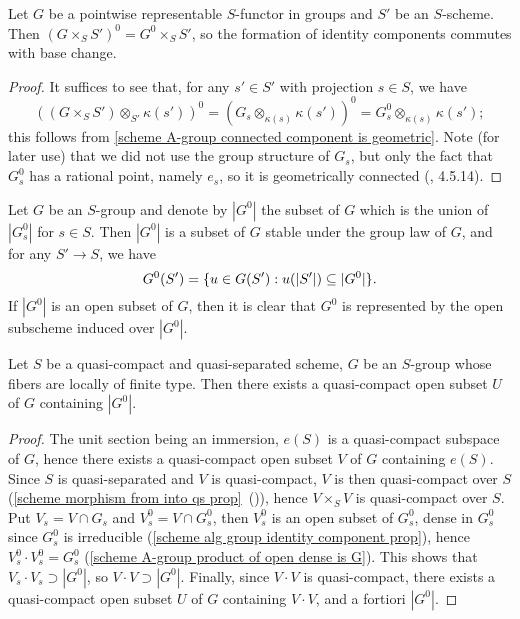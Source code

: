 \begin{proposition}\label{scheme group functor identity component and base change}
Let $G$ be a pointwise representable $S$-functor in groups and $S'$ be an $S$-scheme. Then $(G\times_SS')^0=G^0\times_SS'$, so the formation of identity components commutes with base change.
\end{proposition}
\begin{proof}
It suffices to see that, for any $s'\in S'$ with projection $s\in S$, we have
\[((G\times_SS')\otimes_{S'}\kappa(s'))^0=(G_s\otimes_{\kappa(s)}\kappa(s'))^0=G_s^0\otimes_{\kappa(s)}\kappa(s');\]
this follows from \cref{scheme A-group connected component is geometric}. Note (for later use) that we did not use the group structure of $G_s$, but only the fact that $G_s^0$ has a rational point, namely $e_s$, so it is geometrically connected (\cite{EGA4-2}, 4.5.14).
\end{proof}

\begin{example}\label{scheme group identity component represented by |G^0|}
Let $G$ be an $S$-group and denote by $|G^0|$ the subset of $G$ which is the union of $|G^0_s|$ for $s\in S$. Then $|G^0|$ is a subset of $G$ stable under the group law of $G$, and for any $S'\to S$, we have
\[G^0(S')=\{u\in G(S'):u(|S'|)\subseteq |G^0|\}.\]
If $|G^0|$ is an open subset of $G$, then it is clear that $G^0$ is represented by the open subscheme induced over $|G^0|$.
\end{example}

\begin{proposition}\label{scheme group over qcqs fiber ft identity component qc}
Let $S$ be a quasi-compact and quasi-separated scheme, $G$ be an $S$-group whose fibers are locally of finite type. Then there exists a quasi-compact open subset $U$ of $G$ containing $|G^0|$.
\end{proposition}
\begin{proof}
The unit section being an immersion, $e(S)$ is a quasi-compact subspace of $G$, hence there exists a quasi-compact open subset $V$ of $G$ containing $e(S)$. Since $S$ is quasi-separated and $V$ is quasi-compact, $V$ is then quasi-compact over $S$ (\cref{scheme morphism from into qs prop}~()), hence $V\times_SV$ is quasi-compact over $S$. Put $V_s=V\cap G_s$ and $V^0_s=V\cap G^0_s$, then $V_s^0$ is an open subset of $G^0_s$, dense in $G_s^0$ since $G^0_s$ is irreducible (\cref{scheme alg group identity component prop}), hence $V_s^0\cdot V_s^0=G^0_s$ (\cref{scheme A-group product of open dense is G}). This shows that $V_s\cdot V_s\supset|G^0|$, so $V\cdot V\supset|G^0|$. Finally, since $V\cdot V$ is quasi-compact, there exists a quasi-compact open subset $U$ of $G$ containing $V\cdot V$, and a fortiori $|G^0|$.
\end{proof}

